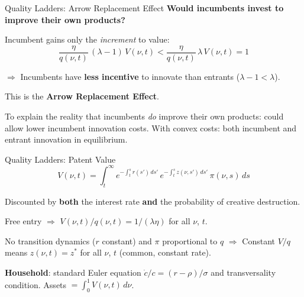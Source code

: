 \documentclass[blue]{beamer}
\begin{document}
		\begin{frame}{Quality Ladders: Arrow Replacement Effect}
			\textbf{Would incumbents invest to improve their own products?}
			
			\bigskip
			Incumbent gains only the \emph{increment} to value:
			\[
			\frac{\eta}{q(\nu,t)}\, (\lambda - 1)\, V(\nu,t) < \frac{\eta}{q(\nu,t)}\, \lambda\, V(\nu,t) = 1
			\]
			
			$\Rightarrow$ Incumbents have \textbf{less incentive} to innovate than entrants ($\lambda - 1 < \lambda$).
			
			This is the \textbf{Arrow Replacement Effect}.
			
			\bigskip
			To explain the reality that incumbents \emph{do} improve their own products: could allow lower incumbent innovation costs. With convex costs: both incumbent and entrant innovation in equilibrium.
		\end{frame}
		\begin{frame}{Quality Ladders: Patent Value}
			\[
			V(\nu,t) = \int_t^\infty e^{-\int_t^s r(s')\, ds'}\, e^{-\int_t^s z(\nu,s')\, ds'}\, \pi(\nu,s)\, ds
			\]
			
			Discounted by \textbf{both} the interest rate \textbf{and} the probability of creative destruction.
			
			\bigskip
			Free entry $\Rightarrow$ $V(\nu,t)/q(\nu,t) = 1/(\lambda\eta)$ for all $\nu$, $t$.
			
			No transition dynamics ($r$ constant) and $\pi$ proportional to $q$ $\Rightarrow$ Constant $V/q$ means $z(\nu,t) = z^*$ for all $\nu$, $t$ (common, constant rate).
			
			\bigskip
			\textbf{Household}: standard Euler equation $\dot{c}/c = (r - \rho)/\sigma$ and transversality condition. Assets $= \int_0^1 V(\nu,t)\, d\nu$.
		\end{frame}
		
\end{document}
